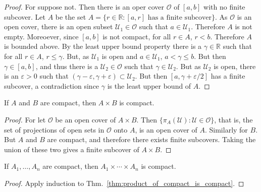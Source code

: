 \documentclass{book}                                                           %
\begin{document}
            \begin{proof}
                For suppose not. Then there is an oper cover $\mathcal{O}$ of
                $[a,b]$ with no finite subcover. Let $A$ be the set
                $A=\{r\in\mathbb{R}:[a,r]\textrm{ has a finite subcover}\}$.
                As $\mathcal{O}$ is an open cover, there is an open subset
                $\mathcal{U}_{1}\in\mathcal{O}$ such that $a\in\mathcal{U}_{1}$.
                Therefore $A$ is not empty. Moreoever, since $[a,b]$ is not compact,
                for all $r\in{A}$, $r<b$. Therefore $A$ is bounded above. By the
                least upper bound property there is a $\gamma\in\mathbb{R}$ such
                that for all $r\in{A}$, $r\leq\gamma$. But, as $\mathcal{U}_{1}$ is
                open and $a\in\mathcal{U}_{1}$, $a<\gamma\leq{b}$. But then
                $\gamma\in[a,b]$, and thus there is a
                $\mathcal{U}_{2}\in\mathcal{O}$ such that
                $\gamma\in\mathcal{U}_{2}$. But as $\mathcal{U}_{2}$ is open, there
                is an $\varepsilon>0$ such that
                $(\gamma-\varepsilon,\gamma+\varepsilon)\subset\mathcal{U}_{2}$.
                But then $[a,\gamma+\varepsilon/2]$ has a finite subcover, a
                contradiction since $\gamma$ is the least upper bound of $A$.
            \end{proof}
            \begin{theorem}
                \label{thm:product_of_compact_is_compact}%
                If $A$ and $B$ are compact, then $A\times{B}$ is compact.
            \end{theorem}
            \begin{proof}
                For let $\mathcal{O}$ be an open cover of $A\times{B}$. Then
                $\{\pi_{A}(\mathcal{U}):\mathcal{U}\in\mathcal{O}\}$, that is,
                the set of projections of open sets in $\mathcal{O}$ onto $A$,
                is an open cover of $A$. Similarly for $B$. But $A$ and $B$ are
                compact, and therefore there exists finite subcovers. Taking
                the union of these two gives a finite subcover of $A\times{B}$.
            \end{proof}
            \begin{theorem}
                \label{thm:finite_product_of_compact_is_compact}%
                If $A_{1},\hdots,A_{n}$ are compact, then
                $A_{1}\times\cdots\times{A_{n}}$ is compact.
            \end{theorem}
            \begin{proof}
                Apply induction to Thm.~\ref{thm:product_of_compact_is_compact}.
            \end{proof}
\end{document}
